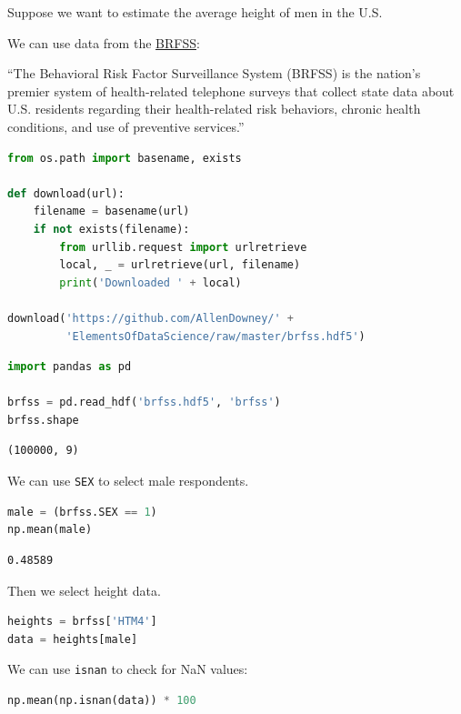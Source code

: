 Suppose we want to estimate the average height of men in the U.S.

We can use data from the
\href{https://www.cdc.gov/brfss/index.html}{BRFSS}:

``The Behavioral Risk Factor Surveillance System (BRFSS) is the nation's
premier system of health-related telephone surveys that collect state
data about U.S. residents regarding their health-related risk behaviors,
chronic health conditions, and use of preventive services.''

\begin{lstlisting}[language=Python,style=source]
from os.path import basename, exists

def download(url):
    filename = basename(url)
    if not exists(filename):
        from urllib.request import urlretrieve
        local, _ = urlretrieve(url, filename)
        print('Downloaded ' + local)
    
download('https://github.com/AllenDowney/' +
         'ElementsOfDataScience/raw/master/brfss.hdf5')
\end{lstlisting}

\begin{lstlisting}[language=Python,style=source]
import pandas as pd

brfss = pd.read_hdf('brfss.hdf5', 'brfss')
brfss.shape
\end{lstlisting}

\begin{lstlisting}[style=output]
(100000, 9)
\end{lstlisting}

We can use \passthrough{\lstinline!SEX!} to select male respondents.

\begin{lstlisting}[language=Python,style=source]
male = (brfss.SEX == 1)
np.mean(male)
\end{lstlisting}

\begin{lstlisting}[style=output]
0.48589
\end{lstlisting}

Then we select height data.

\begin{lstlisting}[language=Python,style=source]
heights = brfss['HTM4']
data = heights[male]
\end{lstlisting}

We can use \passthrough{\lstinline!isnan!} to check for NaN values:

\begin{lstlisting}[language=Python,style=source]
np.mean(np.isnan(data)) * 100
\end{lstlisting}

